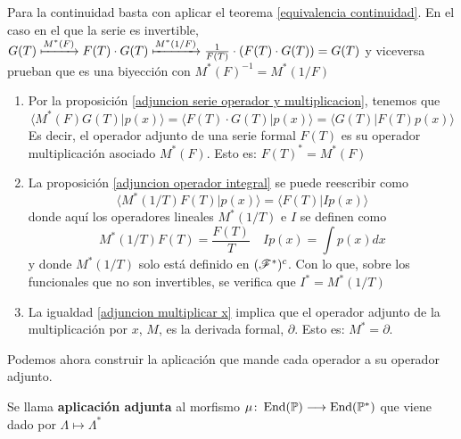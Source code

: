 \begin{demo}
    Para la continuidad basta con aplicar el teorema \ref{equivalencia continuidad}. En el caso en el que la serie es invertible, $G(T) \xmapsto{M^*(F)} F(T) \cdot G(T) \xmapsto{M^*(1/F)} \frac{1}{F(T)} \cdot (F(T) \cdot G(T)) = G(T) $ y viceversa prueban que es una biyección con $M^*(F)^{-1} = M^*(1/F)$
\end{demo}

\begin{ej}
    \begin{enumerate}
        \item Por la proposición \ref{adjuncion serie operador y multiplicacion}, tenemos que
        \begin{equation*}
            \langle M^*(F)G(T) | p(x) \rangle = \langle F(T) \cdot G(T) | p(x) \rangle = \langle G(T) | F(T)p(x) \rangle
        \end{equation*}
        Es decir, el operador adjunto de una serie formal $F(T)$ es su operador multiplicación asociado $M^*(F)$. Esto es: $F(T)^* = M^*(F)$
        \item La proposición \ref{adjuncion operador integral} se puede reescribir como
        \begin{equation*}
            \langle M^*(1/T)F(T) | p(x) \rangle = \langle F(T) | I p(x) \rangle
        \end{equation*}
        donde aquí los operadores lineales $M^*(1/T)$ e $I$ se definen como
        \begin{equation*}
            M^*(1/T)F(T) = \frac{F(T)}{T} \quad I p(x) = \int p(x) dx
        \end{equation*}
        y donde $M^*(1/T)$ solo está definido en $(\mathscr{F}^*)^c$. Con lo que, sobre los funcionales que no son invertibles, se verifica que $I^* = M^*(1/T)$
        \item La igualdad \eqref{adjuncion multiplicar x} implica que el operador adjunto de la multiplicación por $x$, $M$, es la derivada formal, $\partial$. Esto es: $M^* = \partial$.
    \end{enumerate}
\end{ej}

Podemos ahora construir la aplicación que mande cada operador a su operador adjunto. 
\begin{definicion}\label{aplicacion adjunta}
    Se llama \textbf{aplicación adjunta} al morfismo $\mu \colon \operatorname*{End}(\mathbb{P}) \longrightarrow \operatorname*{End}(\mathbb{P}^*)$ que viene dado por $\Lambda \mapsto \Lambda^*$
\end{definicion}

